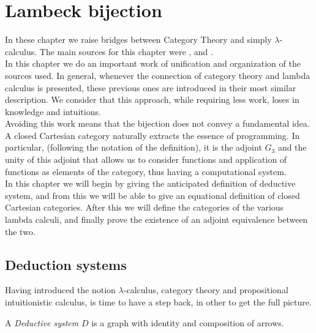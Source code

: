 
\chapter{Lambeck bijection}
\label{chap:4}
\thispagestyle{empty}
In these chapter we raise bridges between Category Theory and simply $\lambda$-calculus. The main sources for this chapter were  \cite{lambek1988introduction}, \cite{lambek1985cartesian} and \cite[Chapter 6]{selinger2008lecture}.\\

In this chapter we do an important work of unification and organization of the sources used. In general, whenever the connection of category theory and lambda calculus is presented, these previous ones are introduced in their most similar description. We consider that this approach, while requiring less work, loses in knowledge and intuitions.\\


Avoiding this work means that the bijection does not convey a fundamental idea. A closed Cartesian category naturally extracts the essence of programming. In particular, (following the notation of the definition), it is the adjoint $G_3$ and the unity of this adjoint that allows us to consider functions and application of functions as elements of the category, thus having a computational system.\\

In this chapter we will begin by giving the anticipated definition of deductive system, and from this we will be able to give an equational definition of closed Cartesian categories.  After this we will define the categories of the various lambda calculi, and finally prove the existence of an adjoint equivalence between the two.\\



\section{Deduction systems}
Having introduced the notion $\lambda$-calculus, category theory and propositional intuitionistic calculus, is time to have a step back, in other to get the full picture.

\begin{definition}
  A \emph{Deductive system} $D$ is a graph  with identity and composition of arrows.
\end{definition}

